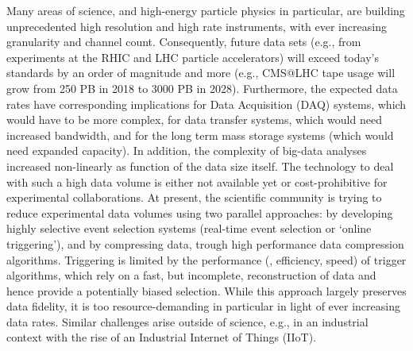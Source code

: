 Many areas of science, and  high-energy particle physics in particular, are building unprecedented high resolution and high rate instruments, with ever increasing granularity and channel count. Consequently,  future data sets  (e.g., from experiments at the RHIC and LHC particle accelerators) will exceed today's standards by an order of magnitude and more (e.g., CMS@LHC tape usage will grow from 250 PB in 2018 to 3000 PB in 2028). Furthermore, the expected data rates have corresponding implications for  Data Acquisition (DAQ) systems, which would have to be more complex, for  data transfer systems, which would need increased bandwidth, and for the long term mass storage systems (which would need expanded capacity). In addition, the complexity of big-data analyses increased non-linearly as function of the data size itself. The technology to deal with such a high data volume is either not available yet or cost-prohibitive for experimental collaborations. At present, the scientific community is trying to reduce  experimental data volumes using two parallel approaches: by developing highly selective event selection systems (\eg real-time event selection or `online triggering'), and by compressing data, trough high performance data compression algorithms. Triggering is limited by the performance (\ie, efficiency, speed) of trigger algorithms, which rely on a fast, but incomplete, reconstruction of data and hence provide a potentially biased selection. While this approach largely preserves data fidelity, it is too resource-demanding in particular in light of ever increasing data rates. Similar challenges arise outside of science, e.g., in an industrial context with the rise of an Industrial Internet of Things (IIoT).

